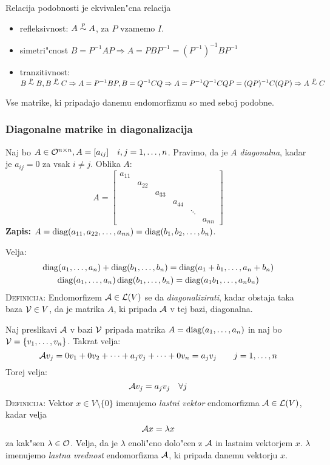 Relacija podobnosti je ekvivalen"cna relacija
\begin{itemize}
	\item refleksivnost: $A \stackrel{p}{\sim} A$, za $P$ vzamemo $I$.
	\item simetri"cnost $B = P^{-1}AP \Rightarrow A = PBP^{-1} = (P^{-1})^{-1}BP^{-1}$
	\item tranzitivnost: $B \stackrel{p}{\sim} B, B \stackrel{p}{\sim} C \Rightarrow A = P^{-1} BP, B = Q^{-1} CQ \Rightarrow A = P^{-1} Q^{-1} CQP = (QP)^{-1} C (QP) \Rightarrow A \stackrel{p}{\sim} C$
\end{itemize}
Vse matrike, ki pripadajo danemu endomorfizmu so med seboj podobne.

\subsubsection{Diagonalne matrike in diagonalizacija}
Naj bo $A \in \mathcal{O}^{n \times n}, A = [a_{ij}] \quad i, j = 1, \ldots, n$. Pravimo, da je $A$ \emph{diagonalna}, kadar je $a_{ij} = 0$ za vsak $i \neq j$. Oblika $A$:
\begin{equation*}
A = \begin{bmatrix}
a_{11}&&&&& \\
&a_{22}&&&& \\
&&a_{33}&&& \\
&&& a_{44}&& \\
&&&& \ddots & \\
&&&&& a_{nn}
\end{bmatrix}
\end{equation*}
\textbf{Zapis:} $A = \operatorname{diag} (a_{11}, a_{22}, \ldots, a_{nn}) = \operatorname{diag} (b_1, b_2, \ldots, b_n)$.

Velja:
\begin{gather*}
\operatorname{diag} (a_1, \ldots, a_n) + \operatorname{diag} (b_1, \ldots, b_n) = \operatorname{diag} (a_1 + b_1, \ldots, a_n + b_n) \\
\operatorname{diag} (a_1, \ldots, a_n)  \operatorname{diag} (b_1, \ldots, b_n) = \operatorname{diag}(a_1 b_1, \ldots, a_n b_n)
\end{gather*}
%
\textsc{Definicija:} Endomorfizem $\mathcal{A} \in \mathcal{L}(V)$ se da \emph{diagonalizirati}, kadar obstaja taka baza $\mathcal{V} \in V$, da je matrika $A$, ki pripada $\mathcal{A}$ v tej bazi, diagonalna.

Naj preslikavi $\mathcal{A}$ v bazi $\mathcal{V}$ pripada matrika $A = \operatorname{diag} (a_1, \ldots, a_n)$ in naj bo $\mathcal{V} = \{v_1, \ldots, v_n\}$. Takrat velja:
\begin{equation*}
\mathcal{A} v_j = 0 v_1 + 0 v_2 + \cdots + a_j v_j + \cdots + 0 v_n = a_j v_j \qquad j = 1, \ldots, n
\end{equation*}
Torej velja:
\begin{equation*}
\mathcal{A} v_j = a_j v_j \quad \forall j
\end{equation*}
%
\textsc{Definicija:} Vektor $x \in V \setminus \{0\}$ imenujemo \emph{lastni vektor} endomorfizma $\mathcal{A} \in \mathcal{L}(V)$, kadar velja
\begin{equation*}
\mathcal{A} x = \lambda x
\end{equation*}
za kak"sen $\lambda \in \mathcal{O}$. Velja, da je $\lambda$ enoli"cno dolo"cen z $\mathcal{A}$ in lastnim vektorjem $x$. $\lambda$ imenujemo \emph{lastna vrednost} endomorfizma $\mathcal{A}$, ki pripada danemu vektorju $x$.

